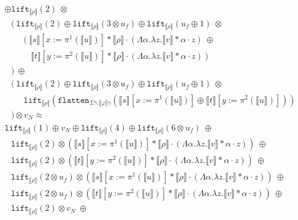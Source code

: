 \documentclass[runningheads,a4paper]{llncs}
\newcommand{\typeinterpret}[1]{\llbracket #1 \rrbracket}
\newcommand{\interpret}[1]{\llbracket #1 \rrbracket}
\newcommand{\abs}[2]{\lambda #1.#2}
\newcommand{\tabs}[2]{\Lambda #1.#2}
\newcommand{\flatten}{\mathtt{flatten}}
\newcommand{\lift}{\mathtt{lift}}
\begin{document}
\begin{itemize}
\[\begin{array}{l}
    \oplus \lift_{\interpret{\rho}}(2)\ \otimes \\
  \phantom{A}
  (\ \lift_{\typeinterpret{\rho}}(2) \oplus
    \lift_{\typeinterpret{\rho}}(3 \otimes u_f) \oplus
     \lift_{\typeinterpret{\rho}}(u_f \oplus 1)\ \otimes \\
  \phantom{ABC}(\ \interpret{s}[x:=\pi^1(\interpret{u})] *
    \typeinterpret{\rho} \cdot
    (\tabs{\alpha}{\abs{z}{\interpret{v} * \alpha \cdot z}})\ \oplus \\
  \phantom{ABCD} \interpret{t}[y:=\pi^2(\interpret{u})] *
    \typeinterpret{\rho} \cdot
    (\tabs{\alpha}{\abs{z}{\interpret{v} * \alpha \cdot z}})\ ) \\
  \phantom{A})\ \oplus \\
  \phantom{A}(\ 
  \lift_{\typeinterpret{\rho}}(2) \oplus
    \lift_{\typeinterpret{\rho}}(3 \otimes u_f) \oplus
  \lift_{\typeinterpret{\rho}}(u_f \oplus 1)\ \otimes \\
  \phantom{ABC}
    \lift_{\typeinterpret{\rho}}(\flatten_{\Sigma\gamma.\typeinterpret{
    \varphi}\gamma}(\interpret{s}[x:=\pi^1(\interpret{u})] \oplus
      \interpret{t}[y:=\pi^2(\interpret{u})])) \\
  \phantom{A}) \otimes v_N \approx \\
  \lift_{\interpret{\rho}}(1) \oplus v_N \oplus
    \lift_{\interpret{\rho}}(4) \oplus
    \lift_{\typeinterpret{\rho}}(6 \otimes u_f)\ \oplus \\
  \phantom{A}
  \lift_{\interpret{\rho}}(2) \otimes
      (\interpret{s}[x:=\pi^1(\interpret{u})] * \typeinterpret{\rho} \cdot
      (\tabs{\alpha}{\abs{z}{\interpret{v} * \alpha \cdot z}}))\ \oplus \\
  \phantom{A}
  \lift_{\interpret{\rho}}(2) \otimes
      (\interpret{t}[y:=\pi^2(\interpret{u})] * \typeinterpret{\rho} \cdot
      (\tabs{\alpha}{\abs{z}{\interpret{v} * \alpha \cdot z}}))\ \oplus \\
  \phantom{A}
  \lift_{\interpret{\rho}}(2 \otimes u_f) \otimes
    (\interpret{s}[x:=\pi^1(\interpret{u})] *
    \typeinterpret{\rho} \cdot
    (\tabs{\alpha}{\abs{z}{\interpret{v} * \alpha \cdot z}}))\ \oplus \\
  \phantom{A}
  \lift_{\interpret{\rho}}(2 \otimes u_f) \otimes
    (\interpret{t}[y:=\pi^2(\interpret{u})] *
    \typeinterpret{\rho} \cdot
    (\tabs{\alpha}{\abs{z}{\interpret{v} * \alpha \cdot z}}))\ \oplus \\
  \phantom{A}
  \lift_{\typeinterpret{\rho}}(2) \otimes v_N\ \oplus \\
  \phantom{A}

\end{array}\]
\end{itemize}
\end{document}
